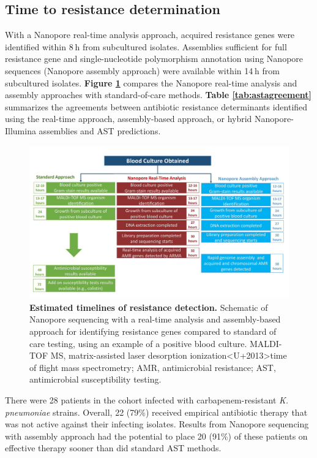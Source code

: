 \subsection{Time to resistance determination}
\label{sec:time}

With a Nanopore real-time analysis approach, acquired resistance genes were identified within 8 h from subcultured isolates. Assemblies sufficient for full resistance gene and single-nucleotide polymorphism annotation using Nanopore sequences (Nanopore assembly approach) were available within 14 h from subcultured isolates. {\bf Figure \ref{fig:timeline}} compares the Nanopore real-time analysis and assembly approaches with standard-of-care methods. {\bf Table \ref{tab:astagreement}} summarizes the agreements between antibiotic resistance determinants identified using the real-time approach, assembly-based approach, or hybrid Nanopore-Illumina assemblies and AST predictions.

\begin{figure}[!ht]
\centering
\includegraphics[width = 1\linewidth,keepaspectratio]{figure/timeline.pdf}
\caption[Estimated timelines of resistance detection]{{\bf Estimated timelines of resistance detection.} Schematic of Nanopore sequencing with a real-time analysis and assembly-based approach for identifying resistance genes compared to standard of care testing, using an example of a positive blood culture. MALDI-TOF MS, matrix-assisted laser desorption ionization<U+2013>time of flight mass spectrometry; AMR, antimicrobial resistance; AST, antimicrobial susceptibility testing. }
\label{fig:timeline}
\end{figure}


There were 28 patients in the cohort infected with carbapenem-resistant \textit{K. pneumoniae} strains. Overall, 22 (79\%) received empirical antibiotic therapy that was not active against their infecting isolates. Results from Nanopore sequencing with assembly approach had the potential to place 20 (91\%) of these patients on effective therapy sooner than did standard AST methods.

